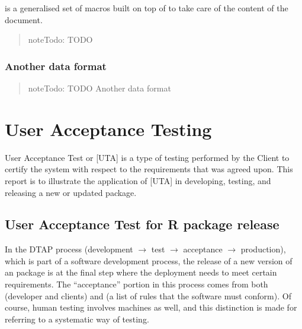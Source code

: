 \documentclass[a4paper,12pt,english]{sphinxhowto}
\begin{document}
 is a generalised set of macros built on top of  to take care of the content of the document.
\begin{quote}

\begin{sphinxadmonition}{note}{\label{\detokenize{DDHH:id2}}Todo:}
TODO
\end{sphinxadmonition}
\end{quote}



\subsubsection{Another data format}
\label{\detokenize{DDHH:another-data-format}}\begin{quote}

\begin{sphinxadmonition}{note}{\label{\detokenize{DDHH:id3}}Todo:}
TODO Another data format
\end{sphinxadmonition}
\end{quote}



\section{User Acceptance Testing}
\label{\detokenize{UAT:user-acceptance-testing}}\label{\detokenize{UAT::doc}}
User Acceptance Test or {[}UTA{]} is a type of testing performed by the Client to certify
the system with respect to the requirements that was agreed upon. This report is to
illustrate the application of {[}UTA{]} in developing, testing, and releasing a new or updated
 package.


\subsection{User Acceptance Test for R package release}
\label{\detokenize{UAT:user-acceptance-test-for-r-package-release}}
In the DTAP process (development \(\to\) test \(\to\) acceptance \(\to\) production),
which is part of a software development process, the release of a new
version of an  package is at the final
step where the deployment needs to meet certain requirements. The
“acceptance” portion in this process comes from both 
(developer and clients) and  (a list of rules that the
software must conform). Of course, human testing involves machines as
well, and this distinction is made for referring to a systematic way of
testing.
\end{document}
